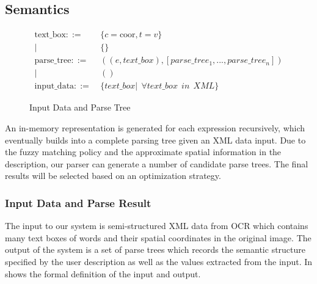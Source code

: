 \subsection{Semantics}
\label{sec:semantics}

\begin{figure}[th]
\centering
\small
\begin{align*}
\text{text\_box} ::=~&\{c=\text{coor}, t=v\}\\
|~& \{\}\\
\text{parse\_tree} ::=~&((e,text\_box), [parse\_tree_1,...,parse\_tree_n])\\
|~& ()\\
\text{input\_data} ::=~&\{text\_box | ~~ \forall text\_box ~~in ~~XML\}
\end{align*}
\caption{Input Data and Parse Tree}
\label{fig:data}
\end{figure}

An in-memory representation is generated for each expression recursively, 
which eventually builds into a complete parsing tree given an XML data input.
Due to the fuzzy matching policy and the approximate spatial information
in the description, our parser can generate a number of candidate parse
trees.  The final results will be selected based on an optimization strategy.

\subsubsection{Input Data and Parse Result}
The input to our system is semi-structured XML data from OCR which
contains many text boxes of words and their spatial coordinates in
the original image. 
The output of the system is a set of parse trees which records the semantic
structure specified by the user description as well as the values extracted
from the input. 
In  shows the formal definition of the input and output.
 
